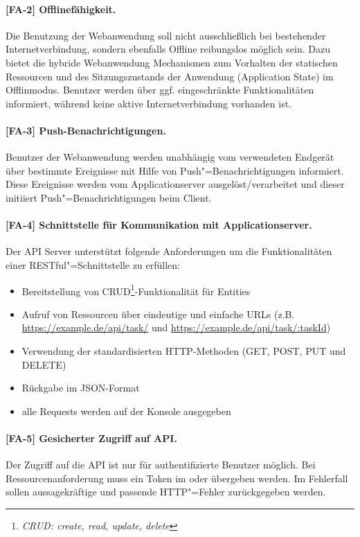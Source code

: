 \paragraph{[FA-2] Offlinefähigkeit.} Die Benutzung der Webanwendung soll nicht ausschließlich bei bestehender Internetverbindung, sondern ebenfalls Offline reibungslos möglich sein. Dazu bietet die hybride Webanwendung Mechanismen zum Vorhalten der statischen Ressourcen und des Sitzungszustands der Anwendung (\glqq Application State\grqq) im Offlinmodus. Benutzer werden über ggf. eingeschränkte Funktionalitäten informiert, während keine aktive Internetverbindung vorhanden ist.

\paragraph{[FA-3] Push-Benachrichtigungen.} Benutzer der Webanwendung werden unabhängig vom verwendeten Endgerät über bestimmte Ereignisse mit Hilfe von Push"=Benachrichtigungen informiert. Diese Ereignisse werden vom Applicationserver ausgelöst/verarbeitet und dieser initiiert Push"=Benachrichtigungen beim Client. 

\paragraph{[FA-4] Schnittstelle für Kommunikation mit Applicationserver.} Der API Server unterstützt folgende Anforderungen um die Funktionalitäten einer RESTful"=Schnittstelle zu erfüllen:

\begin{itemize}
\setlength{\itemsep}{0pt}%
\setlength{\parskip}{0pt}%
\item Bereitstellung von CRUD\footnote{\textit{CRUD: create, read, update, delete}}-Funktionalität für Entities
\item Aufruf von Ressourcen über eindeutige und einfache URLs (z.B. \url{https://example.de/api/task/} und \url{https://example.de/api/task/:taskId}) 
\item Verwendung der standardisierten HTTP-Methoden (GET, POST, PUT und DELETE) 
\item Rückgabe im JSON-Format
\item alle Requests werden auf der Konsole ausgegeben
\end{itemize}  

\paragraph{[FA-5] Gesicherter Zugriff auf API.} Der Zugriff auf die API ist nur für authentifizierte Benutzer möglich. Bei Ressourcenanforderung muss ein Token im  oder  übergeben werden. Im Fehlerfall sollen aussagekräftige und passende HTTP"=Fehler zurückgegeben werden.

